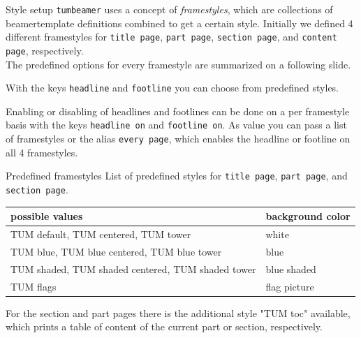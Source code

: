\begin{frame}{Style setup}
  \texttt{tumbeamer} uses a concept of \textit{framestyles}, which are
  collections of beamertemplate definitions combined to get a certain style.
  Initially we defined 4 different framestyles for \texttt{title page},
  \texttt{part page}, \texttt{section page}, and \texttt{content page},
  respectively. \\
  The predefined options for every framestyle are summarized on a following
  slide. \\\vspace{3mm}

  With the keys \texttt{headline} and \texttt{footline} you can choose from
  predefined styles.

  Enabling or disabling of headlines and footlines can be done on a per
  framestyle basis with the keys \texttt{headline on} and
  \texttt{footline on}. As value you can pass a list of framestyles or the
  alias \texttt{every page}, which enables the headline or footline on all 4
  framestyles.
\end{frame}

\begin{frame}{Predefined framestyles}
  List of predefined styles for \texttt{title page}, \texttt{part page},
  and \texttt{section page}.

  \vspace{3mm}
  \begin{tabular}{ll}
    \toprule
    possible values                                   & background color \\
    \midrule
    TUM default, TUM centered, TUM tower              & white            \\
    TUM blue, TUM blue centered, TUM blue tower       & blue             \\
    TUM shaded, TUM shaded centered, TUM shaded tower & blue shaded      \\
    TUM flags                                         & flag picture     \\
    \bottomrule
  \end{tabular}
  \vspace{3mm}

  For the section and part pages there is the additional style
  "TUM toc" available, which prints a table of content of the current
  part or section, respectively.
\end{frame}

